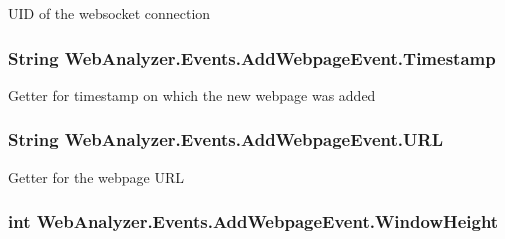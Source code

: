 U\+I\+D of the websocket connection 

\hypertarget{class_web_analyzer_1_1_events_1_1_add_webpage_event_a4d534a36b31fcd6ee317a7d214b31ba7}{}
\subsubsection[{Timestamp}]{\setlength{\rightskip}{0pt plus 5cm}String Web\+Analyzer.\+Events.\+Add\+Webpage\+Event.\+Timestamp\hspace{0.3cm}{\ttfamily [get]}}\label{class_web_analyzer_1_1_events_1_1_add_webpage_event_a4d534a36b31fcd6ee317a7d214b31ba7}


Getter for timestamp on which the new webpage was added 

\hypertarget{class_web_analyzer_1_1_events_1_1_add_webpage_event_a81c2419e44f174687def7a813525fe00}{}
\subsubsection[{U\+R\+L}]{\setlength{\rightskip}{0pt plus 5cm}String Web\+Analyzer.\+Events.\+Add\+Webpage\+Event.\+U\+R\+L\hspace{0.3cm}{\ttfamily [get]}}\label{class_web_analyzer_1_1_events_1_1_add_webpage_event_a81c2419e44f174687def7a813525fe00}


Getter for the webpage U\+R\+L 

\hypertarget{class_web_analyzer_1_1_events_1_1_add_webpage_event_a77f8941177623cdfc87011eaf979c538}{}
\subsubsection[{Window\+Height}]{\setlength{\rightskip}{0pt plus 5cm}int Web\+Analyzer.\+Events.\+Add\+Webpage\+Event.\+Window\+Height\hspace{0.3cm}{\ttfamily [get]}}\label{class_web_analyzer_1_1_events_1_1_add_webpage_event_a77f8941177623cdfc87011eaf979c538}


